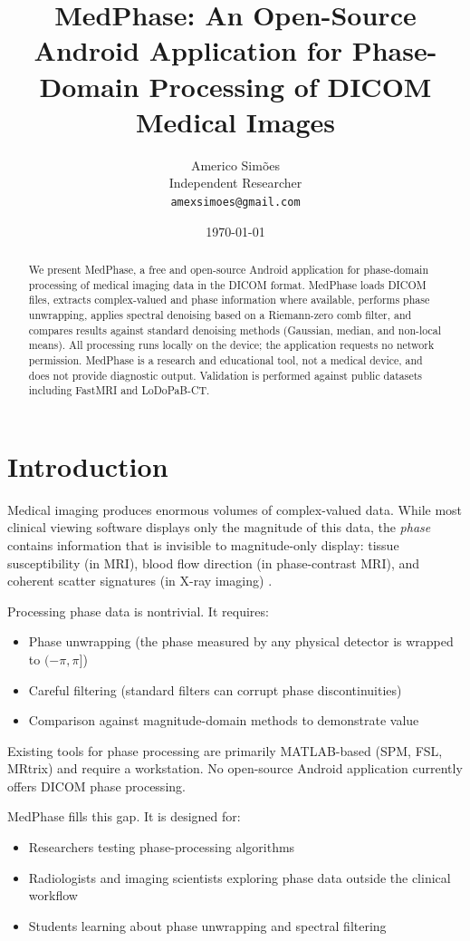 \documentclass[11pt,a4paper]{article}
\title{\textbf{MedPhase: An Open-Source Android Application for Phase-Domain Processing of DICOM Medical Images}}
\author{Americo Sim\~oes\\ \small Independent Researcher\\ \small \texttt{amexsimoes@gmail.com}}
\date{\today}
\begin{document}
\maketitle

\begin{abstract}
We present MedPhase, a free and open-source Android application for phase-domain processing of medical imaging data in the DICOM format. MedPhase loads DICOM files, extracts complex-valued and phase information where available, performs phase unwrapping, applies spectral denoising based on a Riemann-zero comb filter, and compares results against standard denoising methods (Gaussian, median, and non-local means). All processing runs locally on the device; the application requests no network permission. MedPhase is a research and educational tool, not a medical device, and does not provide diagnostic output. Validation is performed against public datasets including FastMRI and LoDoPaB-CT.
\end{abstract}

\section{Introduction}

Medical imaging produces enormous volumes of complex-valued data. While most clinical viewing software displays only the magnitude of this data, the \emph{phase} contains information that is invisible to magnitude-only display: tissue susceptibility (in MRI), blood flow direction (in phase-contrast MRI), and coherent scatter signatures (in X-ray imaging) \cite{haacke1999,bernstein2004}.

Processing phase data is nontrivial. It requires:
\begin{itemize}
\item Phase unwrapping (the phase measured by any physical detector is wrapped to $(-\pi, \pi]$)
\item Careful filtering (standard filters can corrupt phase discontinuities)
\item Comparison against magnitude-domain methods to demonstrate value
\end{itemize}

Existing tools for phase processing are primarily MATLAB-based (SPM, FSL, MRtrix) and require a workstation. No open-source Android application currently offers DICOM phase processing.

MedPhase fills this gap. It is designed for:
\begin{itemize}
\item Researchers testing phase-processing algorithms
\item Radiologists and imaging scientists exploring phase data outside the clinical workflow
\item Students learning about phase unwrapping and spectral filtering
\end{itemize}
\end{document}
